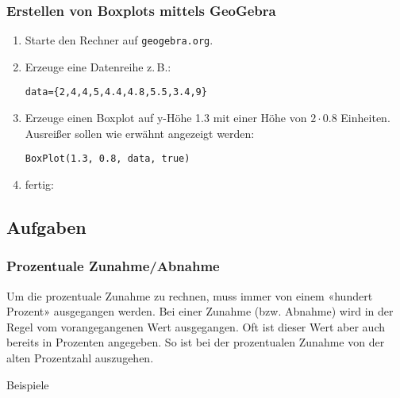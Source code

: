 \subsubsection{Erstellen von Boxplots mittels GeoGebra}
\begin{enumerate}
\item Starte den Rechner auf \texttt{geogebra.org}.
\item Erzeuge eine Datenreihe z.\,B.:

\texttt{data=\{2,4,4,5,4.4,4.8,5.5,3.4,9\}}


\item Erzeuge einen Boxplot auf y-Höhe 1.3 mit einer Höhe von
  $2\cdot{}0.8$ Einheiten. Ausreißer sollen wie erwähnt angezeigt
  werden:

  \texttt{BoxPlot(1.3, 0.8, data, true)}

\item fertig:


  
\end{enumerate}

\subsection*{Aufgaben}


\newpage
\subsubsection{Prozentuale Zunahme/Abnahme}\index{\%}
Um die prozentuale Zunahme zu rechnen, muss immer von einem «hundert
Prozent» ausgegangen werden. Bei einer Zunahme (bzw. Abnahme) wird in
der Regel vom vorangegangenen Wert ausgegangen. Oft ist dieser Wert
aber auch bereits in Prozenten angegeben. So ist bei der prozentualen
Zunahme von der alten Prozentzahl auszugehen.

Beispiele

